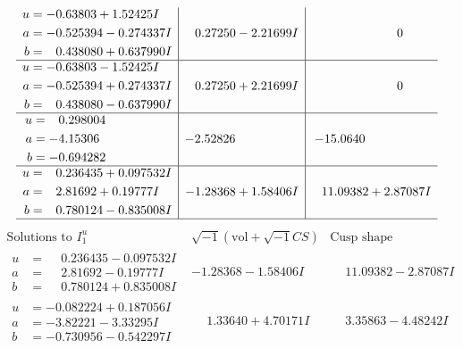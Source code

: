 \documentclass[1p]{elsarticle_modified}
\theoremstyle{definition}
\newcommand{\I}{\sqrt{-1}}
\begin{document}
$$\begin{array}{c|c|c}
\begin{aligned}
u &= -0.63803 + 1.52425 I \\
a &= -0.525394 - 0.274337 I \\
b &= \phantom{-}0.438080 + 0.637990 I\end{aligned}
 & \phantom{-}0.27250 - 2.21699 I & \phantom{-0.000000 } 0 \\ \hline\begin{aligned}
u &= -0.63803 - 1.52425 I \\
a &= -0.525394 + 0.274337 I \\
b &= \phantom{-}0.438080 - 0.637990 I\end{aligned}
 & \phantom{-}0.27250 + 2.21699 I & \phantom{-0.000000 } 0 \\ \hline\begin{aligned}
u &= \phantom{-}0.298004\phantom{ +0.000000I} \\
a &= -4.15306\phantom{ +0.000000I} \\
b &= -0.694282\phantom{ +0.000000I}\end{aligned}
 & -2.52826\phantom{ +0.000000I} & -15.0640\phantom{ +0.000000I} \\ \hline\begin{aligned}
u &= \phantom{-}0.236435 + 0.097532 I \\
a &= \phantom{-}2.81692 + 0.19777 I \\
b &= \phantom{-}0.780124 - 0.835008 I\end{aligned}
 & -1.28368 + 1.58406 I & \phantom{-}11.09382 + 2.87087 I\\
 \hline 
 \end{array}$$\newpage$$\begin{array}{c|c|c}  
\text{Solutions to }I^u_{1}& \I (\text{vol} + \sqrt{-1}CS) & \text{Cusp shape}\\
 \hline 
\begin{aligned}
u &= \phantom{-}0.236435 - 0.097532 I \\
a &= \phantom{-}2.81692 - 0.19777 I \\
b &= \phantom{-}0.780124 + 0.835008 I\end{aligned}
 & -1.28368 - 1.58406 I & \phantom{-}11.09382 - 2.87087 I \\ \hline\begin{aligned}
u &= -0.082224 + 0.187056 I \\
a &= -3.82221 - 3.33295 I \\
b &= -0.730956 - 0.542297 I\end{aligned}
 & \phantom{-}1.33640 + 4.70171 I & \phantom{-}3.35863 - 4.48242 I \\ \hline\begin{aligned}

\end{aligned}
\end{array}$$
\end{document}
